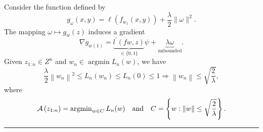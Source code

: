 \documentclass[twoside]{article}
\newenvironment{proof}{{\bf Proof:}}{\hfill\rule{2mm}{2mm}}
\begin{document}
\begin{proof}

\vspace{5mm}
Consider the function defined by
\begin{equation}
g_{\omega}(x, y) = \ell\left(f_{w_{1}}(x, y)\right) + \frac{\lambda}{2}\|\omega\|^2.
\end{equation}
The mapping $\omega \mapsto g_{w}(z)$ induces a gradient
\begin{equation}
\nabla g_{w(1)} = \underbrace{l^{\prime}(f w, z)}_{\in\{0,1\}} \psi + \underbrace{\lambda \omega}_{\text{unbounded}}.
\end{equation}
Given $z_{1: n} \in Z^{n}$ and $w_{n} \in \operatorname{argmin} L_{n}(w)$, we have
\begin{equation}
\frac{\lambda}{2}\left\|w_{n}\right\|^2 \leq L_n\left(w_{n}\right) \leq L_n(0) \leq 1 \Rightarrow \left\|w_{n}\right\| \leq \sqrt{\frac{2}{\lambda}},
\end{equation}
where
\begin{equation}
\mathcal{A} \left(z_{1:n}\right) = \operatorname{argmin}_{w \in C} L_n(w) \quad \text{and} \quad C = \left\{w : \left\|w\right\| \leq \sqrt{\frac{2}{\lambda}}\right\}.
\end{equation}
\end{proof}
\end{document}
